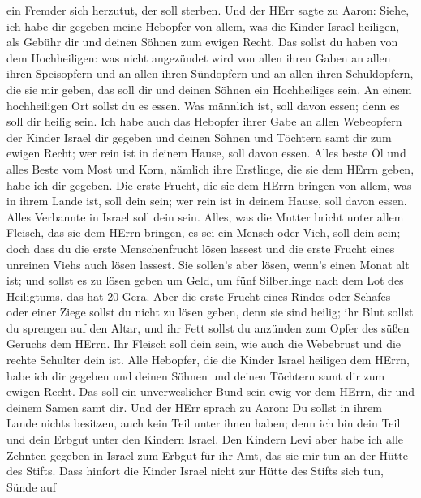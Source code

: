ein Fremder sich herzutut, der soll sterben.  Und der HErr
sagte zu Aaron: Siehe, ich habe dir gegeben meine Hebopfer von allem,
was die Kinder Israel heiligen, als Gebühr dir und deinen Söhnen zum
ewigen Recht.  Das sollst du haben von dem Hochheiligen: was
nicht angezündet wird von allen ihren Gaben an allen ihren Speisopfern
und an allen ihren Sündopfern und an allen ihren Schuldopfern, die sie
mir geben, das soll dir und deinen Söhnen ein Hochheiliges sein.
 An einem hochheiligen Ort sollst du es essen. Was männlich
ist, soll davon essen; denn es soll dir heilig sein.  Ich
habe auch das Hebopfer ihrer Gabe an allen Webeopfern der Kinder Israel
dir gegeben und deinen Söhnen und Töchtern samt dir zum ewigen Recht;
wer rein ist in deinem Hause, soll davon essen.  Alles
beste Öl und alles Beste vom Most und Korn, nämlich ihre Erstlinge, die
sie dem HErrn geben, habe ich dir gegeben.  Die erste
Frucht, die sie dem HErrn bringen von allem, was in ihrem Lande ist,
soll dein sein; wer rein ist in deinem Hause, soll davon essen.
 Alles Verbannte in Israel soll dein sein. 
Alles, was die Mutter bricht unter allem Fleisch, das sie dem HErrn
bringen, es sei ein Mensch oder Vieh, soll dein sein; doch dass du die
erste Menschenfrucht lösen lassest und die erste Frucht eines unreinen
Viehs auch lösen lassest.  Sie sollen's aber lösen, wenn's
einen Monat alt ist; und sollst es zu lösen geben um Geld, um fünf
Silberlinge nach dem Lot des Heiligtums, das hat 20 Gera. 
Aber die erste Frucht eines Rindes oder Schafes oder einer Ziege sollst
du nicht zu lösen geben, denn sie sind heilig; ihr Blut sollst du
sprengen auf den Altar, und ihr Fett sollst du anzünden zum Opfer des
süßen Geruchs dem HErrn.  Ihr Fleisch soll dein sein, wie
auch die Webebrust und die rechte Schulter dein ist.  Alle
Hebopfer, die die Kinder Israel heiligen dem HErrn, habe ich dir gegeben
und deinen Söhnen und deinen Töchtern samt dir zum ewigen Recht. Das
soll ein unverweslicher Bund sein ewig vor dem HErrn, dir und deinem
Samen samt dir.  Und der HErr sprach zu Aaron: Du sollst in
ihrem Lande nichts besitzen, auch kein Teil unter ihnen haben; denn ich
bin dein Teil und dein Erbgut unter den Kindern Israel. 
Den Kindern Levi aber habe ich alle Zehnten gegeben in Israel zum Erbgut
für ihr Amt, das sie mir tun an der Hütte des Stifts.  Dass
hinfort die Kinder Israel nicht zur Hütte des Stifts sich tun, Sünde auf

